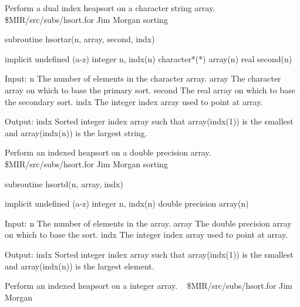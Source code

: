 %
\noindent Perform a dual index heapsort on a character string array.
\newline \ 
\newline {} \$MIR/src/subs/hsort.for
\newline {} Jim Morgan
\newline {} sorting
\par{\tenpoint
{\eightpoint\begintt
      subroutine hsortar(n, array, second, indx)

      implicit undefined (a-z)
      integer n, indx(n)
      character*(*) array(n)
      real second(n)

     Input:
       n        The number of elements in the character array.
       array    The character array on which to base the primary sort.
       second   The real array on which to base the secondary sort.
       indx     The integer index array used to point at array.

     Output:
       indx     Sorted integer index array such that array(indx(1)) is
                the smallest and array(indx(n)) is the largest string.
\endtt}
\par}
%
\noindent Perform an indexed heapsort on a double precision array.
\newline \ 
\newline \abox{File:} \$MIR/src/subs/hsort.for
\newline {} Jim Morgan
\newline \abox{Keywords:} sorting
\par{\tenpoint
{\eightpoint\begintt
      subroutine hsortd(n, array, indx)

      implicit undefined (a-z)
      integer n, indx(n)
      double precision array(n)

     Input:
       n        The number of elements in the array.
       array    The double precision array on which to base the sort.
       indx     The integer index array used to point at array.

     Output:
       indx     Sorted integer index array such that array(indx(1)) is
                the smallest and array(indx(n)) is the largest element.
\endtt}
\par}
%
\noindent Perform an indexed heapsort on a integer array.
\newline \ 
\newline {} \$MIR/src/subs/hsort.for
\newline \abox{Responsible:} Jim Morgan
